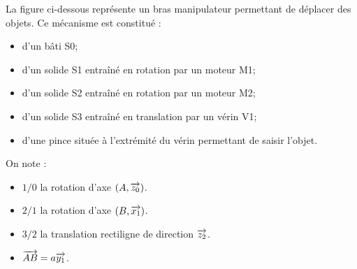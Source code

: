 \documentclass[10pt,oneside]{article}
\begin{document}
\begin{minipage}[c]{.45\linewidth}
La figure ci-dessous représente un bras manipulateur permettant de déplacer des objets.
Ce mécanisme est constitué :
\begin{itemize}
\item d'un bâti S0;
\item d'un solide S1 entraîné en rotation par un moteur M1;
\item d'un solide S2 entraîné en rotation par un moteur M2;
\item d'un solide S3 entraîné en translation par un vérin V1;
\item d'une pince située à l’extrémité du vérin permettant de saisir l’objet.
\end{itemize}

On note : 
\begin{itemize}
\item $1/0$ la rotation d'axe $(A,\overrightarrow{z_0})$.
\item $2/1$ la rotation d'axe $(B,\overrightarrow{x_1})$.
\item $3/2$ la translation rectiligne de direction $\overrightarrow{z_2}$.
\item $\overrightarrow{AB}=a\overrightarrow{y_1}$.
\end{itemize}

\end{minipage}\hfill%
\end{document}

